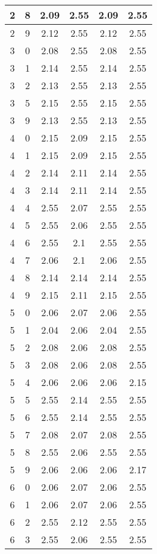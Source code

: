 \begin{longtable}{|c|c||c||c||c|c|}
	2 & 8 & 2.09 & 2.55 & 2.09 & 2.55 \\ \hline
	2 & 9 & 2.12 & 2.55 & 2.12 & 2.55 \\ \hline
	3 & 0 & 2.08 & 2.55 & 2.08 & 2.55 \\ \hline
	3 & 1 & 2.14 & 2.55 & 2.14 & 2.55 \\ \hline
	3 & 2 & 2.13 & 2.55 & 2.13 & 2.55 \\ \hline
	3 & 5 & 2.15 & 2.55 & 2.15 & 2.55 \\ \hline
	3 & 9 & 2.13 & 2.55 & 2.13 & 2.55 \\ \hline
	4 & 0 & 2.15 & 2.09 & 2.15 & 2.55 \\ \hline
	4 & 1 & 2.15 & 2.09 & 2.15 & 2.55 \\ \hline
	4 & 2 & 2.14 & 2.11 & 2.14 & 2.55 \\ \hline
	4 & 3 & 2.14 & 2.11 & 2.14 & 2.55 \\ \hline
	4 & 4 & 2.55 & 2.07 & 2.55 & 2.55 \\ \hline
	4 & 5 & 2.55 & 2.06 & 2.55 & 2.55 \\ \hline
	4 & 6 & 2.55 & 2.1 & 2.55 & 2.55 \\ \hline
	4 & 7 & 2.06 & 2.1 & 2.06 & 2.55 \\ \hline
	4 & 8 & 2.14 & 2.14 & 2.14 & 2.55 \\ \hline
	4 & 9 & 2.15 & 2.11 & 2.15 & 2.55 \\ \hline
	5 & 0 & 2.06 & 2.07 & 2.06 & 2.55 \\ \hline
	5 & 1 & 2.04 & 2.06 & 2.04 & 2.55 \\ \hline
	5 & 2 & 2.08 & 2.06 & 2.08 & 2.55 \\ \hline
	5 & 3 & 2.08 & 2.06 & 2.08 & 2.55 \\ \hline
	5 & 4 & 2.06 & 2.06 & 2.06 & 2.15 \\ \hline
	5 & 5 & 2.55 & 2.14 & 2.55 & 2.55 \\ \hline
	5 & 6 & 2.55 & 2.14 & 2.55 & 2.55 \\ \hline
	5 & 7 & 2.08 & 2.07 & 2.08 & 2.55 \\ \hline
	5 & 8 & 2.55 & 2.06 & 2.55 & 2.55 \\ \hline
	5 & 9 & 2.06 & 2.06 & 2.06 & 2.17 \\ \hline
	6 & 0 & 2.06 & 2.07 & 2.06 & 2.55 \\ \hline
	6 & 1 & 2.06 & 2.07 & 2.06 & 2.55 \\ \hline
	6 & 2 & 2.55 & 2.12 & 2.55 & 2.55 \\ \hline
	6 & 3 & 2.55 & 2.06 & 2.55 & 2.55 \\ \hline

\end{longtable}
